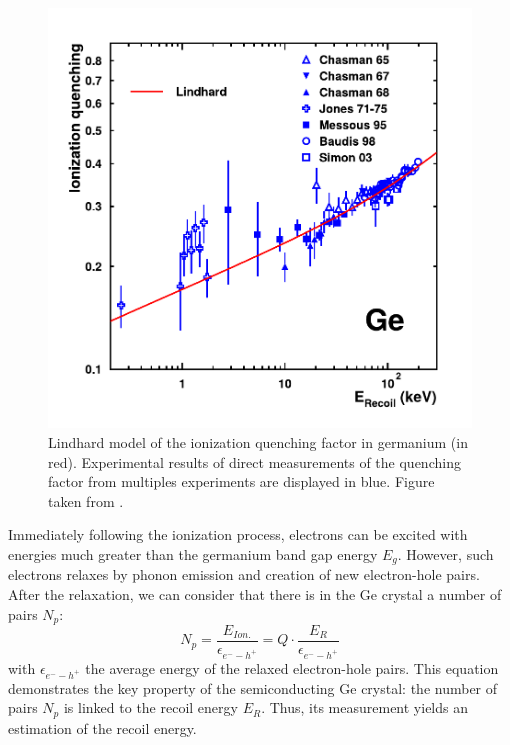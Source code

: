 \begin{figure}
\centering
\includegraphics[scale=0.5]{Figures/Electrodes/ge_quenching.pdf}
\caption{Lindhard model of the ionization quenching factor in germanium (in red). Experimental results of direct measurements of the quenching factor from multiples experiments are displayed in blue. Figure taken from \cite{Benoit:2006qc}.}
\label{fig:ge-quenching}
\end{figure}

Immediately following the ionization process, electrons can be excited with energies much greater than the germanium band gap energy $E_g$. However, such electrons relaxes by phonon emission and creation of new electron-hole pairs. After the relaxation, we can consider that there is in the Ge crystal a number of pairs $N_p$:
\begin{equation}
\label{eq:number-pairs}
N_p = \frac{E_{Ion.}}{\epsilon_{e^--h^+}} =  Q \cdot \frac{E_R}{\epsilon_{e^--h^+}}
\end{equation}
with $\epsilon_{e^--h^+}$ the average energy of the relaxed electron-hole pairs. This equation demonstrates the key property of the semiconducting Ge crystal: the number of pairs $N_p$ is linked to the recoil energy $E_R$. Thus, its measurement yields an estimation of the recoil energy.

